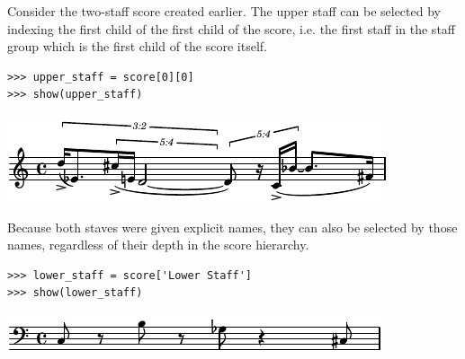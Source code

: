 \documentclass{article}
\begin{document}



Consider the two-staff score created earlier. The upper staff can be selected
by indexing the first child of the first child of the score, i.e. the first
staff in the staff group which is the first child of the score itself.

\begin{lstlisting}
>>> upper_staff = score[0][0]
>>> show(upper_staff)
\end{lstlisting}
\includegraphics{assets/lilypond-5db9f4197c984cbc17b69ed1ab39af68.pdf}

Because both staves were given explicit names, they can also be selected by
those names, regardless of their depth in the score hierarchy.

\begin{lstlisting}
>>> lower_staff = score['Lower Staff']
>>> show(lower_staff)
\end{lstlisting}
\includegraphics{assets/lilypond-fa746e527d218a814e36af2f46d314bb.pdf}
\end{document}
